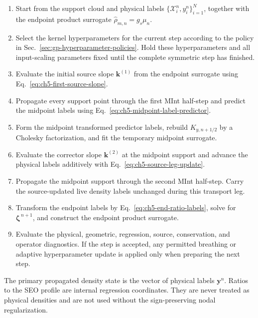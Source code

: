\documentclass[
  11pt,
  letterpaper,
  onehalfspacing,
  normalmargins,
  equalmargins,
  oneside
]{ut-thesis}
\begin{document}
\begin{enumerate}
\item Start from the support cloud and physical labels
\(\{\boldsymbol{\mathcal X}_i^n,y_i^n\}_{i=1}^{N}\), together with the
endpoint product surrogate \(\widehat{\rho}_{m,n}=g_s\mu_n\).

\item Select the kernel hyperparameters for the current step according to the
policy in Sec.~\ref{sec:gp-hyperparameter-policies}. Hold these
hyperparameters and all input-scaling parameters fixed until the complete
symmetric step has finished.

\item Evaluate the initial source slope \(\mathbf k^{(1)}\) from the endpoint
surrogate using Eq.~\eqref{eq:ch5-first-source-slope}.

\item Propagate every support point through the first MInt half-step and
predict the midpoint labels using
Eq.~\eqref{eq:ch5-midpoint-label-predictor}.

\item Form the midpoint transformed predictor labels, rebuild
\(K_{y,n+1/2}\) by a Cholesky factorization, and fit the temporary midpoint
surrogate.

\item Evaluate the corrector slope \(\mathbf k^{(2)}\) at the midpoint
support and advance the physical labels additively with
Eq.~\eqref{eq:ch5-source-leg-update}.

\item Propagate the midpoint support through the second MInt half-step. Carry
the source-updated live density labels unchanged during this transport leg.

\item Transform the endpoint labels by
Eq.~\eqref{eq:ch5-end-ratio-labels}, solve for
\(\boldsymbol\zeta^{\,n+1}\), and construct the endpoint product surrogate.

\item Evaluate the physical, geometric, regression, source, conservation, and operator
diagnostics. If the step is accepted, any permitted breathing or adaptive
hyperparameter update is applied only when preparing the next step.
\end{enumerate}

The primary propagated density state is the vector of physical labels
\(\mathbf y^n\). Ratios to the SEO profile are internal regression
coordinates. They are never treated as physical densities and are not used
without the sign-preserving nodal regularization.
\end{document}
